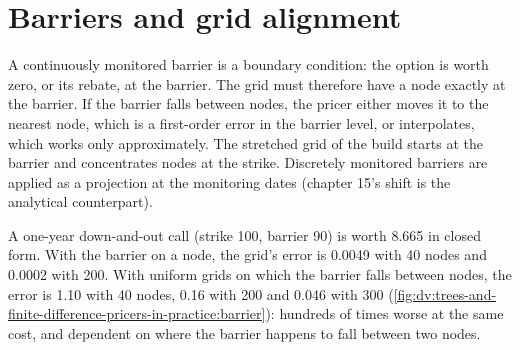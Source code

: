 \section{Barriers and grid alignment}

A continuously monitored barrier is a boundary condition: the option is worth zero, or its rebate, at the barrier. The grid must therefore
have a node exactly at the barrier. If the barrier falls between nodes, the pricer either moves it to the nearest node, which is a
first-order error in the barrier level, or interpolates, which works only approximately. The stretched grid of the build starts at the
barrier and concentrates nodes at the strike. Discretely monitored barriers are applied as a projection at the monitoring dates (chapter
15's shift is the analytical counterpart).

\begin{example}\label{ex:dv:trees-and-finite-difference-pricers-in-practice:barrier}
A one-year down-and-out call (strike 100, barrier 90) is worth 8.665 in closed form. With the barrier on a node, the grid's error is 0.0049
with 40 nodes and 0.0002 with 200. With uniform grids on which the barrier falls between nodes, the error is 1.10 with 40 nodes, 0.16 with 200 and
0.046 with 300 (\cref{fig:dv:trees-and-finite-difference-pricers-in-practice:barrier}): hundreds of times worse at the same cost, and
dependent on where the barrier happens to fall between two nodes.
\end{example}

\begin{omfigure}

\label{fig:dv:trees-and-finite-difference-pricers-in-practice:barrier}
\end{omfigure}

